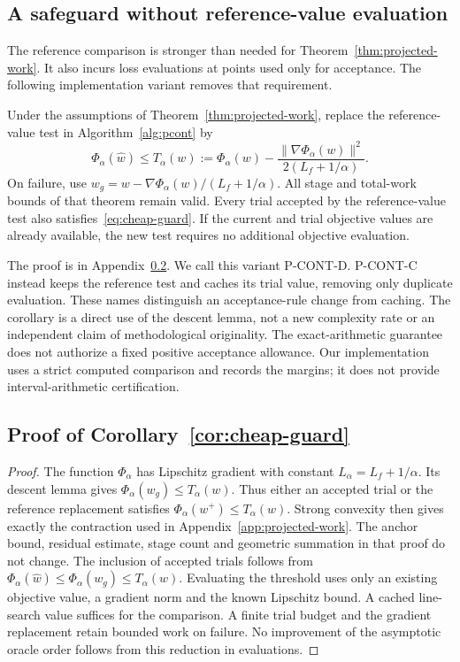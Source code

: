 \subsection{A safeguard without reference-value evaluation}\label{sec:cheap-guard}
The reference comparison is stronger than needed for Theorem~\ref{thm:projected-work}. It also incurs loss evaluations at points used only for acceptance. The following implementation variant removes that requirement.
\begin{corollary}\label{cor:cheap-guard}
Under the assumptions of Theorem~\ref{thm:projected-work}, replace the reference-value test in Algorithm~\ref{alg:pcont} by
\begin{equation}\label{eq:cheap-guard}
\Phi_\alpha(\widehat w)\le T_\alpha(w):=
\Phi_\alpha(w)-\frac{\|\nabla\Phi_\alpha(w)\|^2}{2(L_f+1/\alpha)}.
\end{equation}
On failure, use $w_g=w-\nabla\Phi_\alpha(w)/(L_f+1/\alpha)$. All stage and total-work bounds of that theorem remain valid. Every trial accepted by the reference-value test also satisfies~\eqref{eq:cheap-guard}. If the current and trial objective values are already available, the new test requires no additional objective evaluation.
\end{corollary}
The proof is in Appendix~\ref{app:cheap-guard}. We call this variant P-CONT-D. P-CONT-C instead keeps the reference test and caches its trial value, removing only duplicate evaluation. These names distinguish an acceptance-rule change from caching. The corollary is a direct use of the descent lemma, not a new complexity rate or an independent claim of methodological originality. The exact-arithmetic guarantee does not authorize a fixed positive acceptance allowance. Our implementation uses a strict computed comparison and records the margins; it does not provide interval-arithmetic certification.

\subsection{Proof of Corollary~\ref{cor:cheap-guard}}\label{app:cheap-guard}
\begin{proof}
The function $\Phi_\alpha$ has Lipschitz gradient with constant $L_\alpha=L_f+1/\alpha$. Its descent lemma gives $\Phi_\alpha(w_g)\le T_\alpha(w)$. Thus either an accepted trial or the reference replacement satisfies $\Phi_\alpha(w^+)\le T_\alpha(w)$. Strong convexity then gives exactly the contraction used in Appendix~\ref{app:projected-work}. The anchor bound, residual estimate, stage count and geometric summation in that proof do not change. The inclusion of accepted trials follows from $\Phi_\alpha(\widehat w)\le\Phi_\alpha(w_g)\le T_\alpha(w)$. Evaluating the threshold uses only an existing objective value, a gradient norm and the known Lipschitz bound. A cached line-search value suffices for the comparison. A finite trial budget and the gradient replacement retain bounded work on failure. No improvement of the asymptotic oracle order follows from this reduction in evaluations.
\end{proof}
